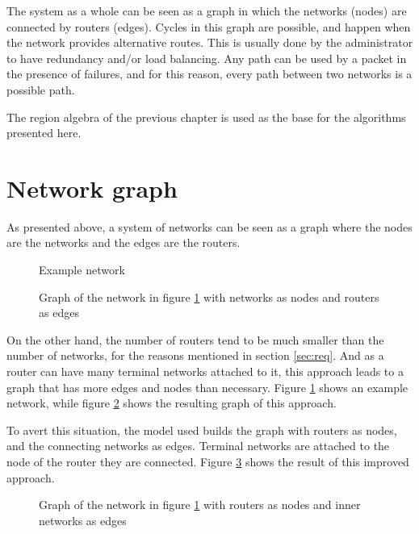 The system as a whole can be seen as a graph in which the networks (nodes) are
connected by routers (edges). Cycles in this graph are possible, and happen when
the network provides alternative routes. This is usually done by the
administrator to have redundancy and/or load balancing. Any path can be used by
a packet in the presence of failures, and for this reason, every path between
two networks is a possible path.

The region algebra of the previous chapter is used as the base for the
algorithms presented here.



\section{Network graph}

As presented above, a system of networks can be seen as a graph where the nodes
are the networks and the edges are the routers.

\begin{figure}
	\caption{\label{fig:networkExample1}Example network}
\end{figure}

\begin{figure}
	\caption{\label{fig:networkExample1Graph1}Graph of the network in
	figure \ref{fig:networkExample1} with networks as nodes and routers as
	edges}
\end{figure}

On the other hand, the number of routers tend to be much smaller than the number
of networks, for the reasons mentioned in section \ref{sec:req}.  And as a
router can have many terminal networks attached to it, this approach leads to a
graph that has more edges and nodes than necessary.  Figure
\ref{fig:networkExample1} shows an example network, while figure
\ref{fig:networkExample1Graph1} shows the resulting graph of this approach.

To avert this situation, the model used builds the graph with routers as nodes,
and the connecting networks as edges. Terminal networks are attached to the node
of the router they are connected. Figure \ref{fig:networkExample1Graph2}
shows the result of this improved approach.

\begin{figure}
	\caption{\label{fig:networkExample1Graph2}Graph of the network in
	figure \ref{fig:networkExample1} with routers as nodes and inner networks as
	edges}
\end{figure}

